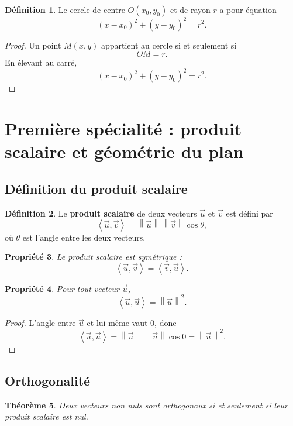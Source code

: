 \documentclass[11pt,a4paper]{article}
\newcommand{\norme}[1]{\left\|#1\right\|}
\newcommand{\ps}[2]{\left\langle #1,#2\right\rangle}
\newcommand{\uu}{\overrightarrow{u}}
\newcommand{\vv}{\overrightarrow{v}}
\theoremstyle{definition}
\newtheorem{definition}{Définition}[section]
\theoremstyle{plain}
\newtheorem{propriete}[definition]{Propriété}
\newtheorem{theoreme}[definition]{Théorème}
\begin{document}
\begin{definition}
Le cercle de centre $O(x_0,y_0)$ et de rayon $r$ a pour équation
\[
(x-x_0)^2+(y-y_0)^2=r^2.
\]
\end{definition}

\begin{proof}
Un point $M(x,y)$ appartient au cercle si et seulement si
\[
OM=r.
\]
En élevant au carré,
\[
(x-x_0)^2+(y-y_0)^2=r^2.
\]
\end{proof}

\newpage

\section{Première spécialité : produit scalaire et géométrie du plan}

\subsection{Définition du produit scalaire}

\begin{definition}
Le \textbf{produit scalaire} de deux vecteurs $\uu$ et $\vv$ est défini par
\[
\ps{\uu}{\vv}=\norme{\uu}\,\norme{\vv}\cos\theta,
\]
où $\theta$ est l'angle entre les deux vecteurs.
\end{definition}

\begin{propriete}
Le produit scalaire est symétrique :
\[
\ps{\uu}{\vv}=\ps{\vv}{\uu}.
\]
\end{propriete}

\begin{propriete}
Pour tout vecteur $\uu$,
\[
\ps{\uu}{\uu}=\norme{\uu}^2.
\]
\end{propriete}

\begin{proof}
L'angle entre $\uu$ et lui-même vaut $0$, donc
\[
\ps{\uu}{\uu}=\norme{\uu}\,\norme{\uu}\cos 0=\norme{\uu}^2.
\]
\end{proof}

\subsection{Orthogonalité}

\begin{theoreme}
Deux vecteurs non nuls sont orthogonaux si et seulement si leur produit scalaire est nul.
\end{theoreme}
\end{document}
